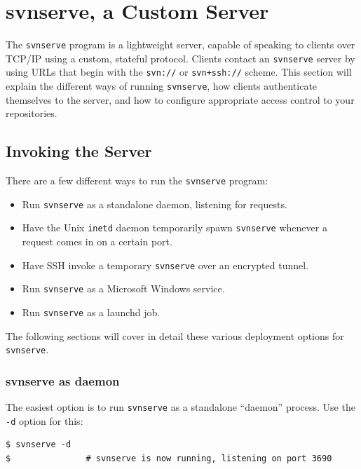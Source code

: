 \section{svnserve, a Custom Server}\label{svn.serverconfig.svnserve}

The \texttt{svnserve} program is a lightweight server, capable of
speaking to clients over TCP/IP using a custom, stateful protocol.
Clients contact an \texttt{svnserve} server by using URLs that begin
with the \texttt{svn://} or \texttt{svn+ssh://} scheme. This section
will explain the different ways of running \texttt{svnserve}, how
clients authenticate themselves to the server, and how to configure
appropriate access control to your repositories.

\subsection{Invoking the
Server}\label{svn.serverconfig.svnserve.invoking}

There are a few different ways to run the \texttt{svnserve} program:

\begin{itemize}
\item
  Run \texttt{svnserve} as a standalone daemon, listening for requests.
\item
  Have the Unix \texttt{inetd} daemon temporarily spawn
  \texttt{svnserve} whenever a request comes in on a certain port.
\item
  Have SSH invoke a temporary \texttt{svnserve} over an encrypted
  tunnel.
\item
  Run \texttt{svnserve} as a Microsoft Windows service.
\item
  Run \texttt{svnserve} as a launchd job.
\end{itemize}

The following sections will cover in detail these various deployment
options for \texttt{svnserve}.

\subsubsection{svnserve as
daemon}\label{svn.serverconfig.svnserve.invoking.daemon}

The easiest option is to run \texttt{svnserve} as a standalone
``daemon'' process. Use the \texttt{-d} option for this:

\begin{verbatim}
$ svnserve -d
$               # svnserve is now running, listening on port 3690
\end{verbatim}

